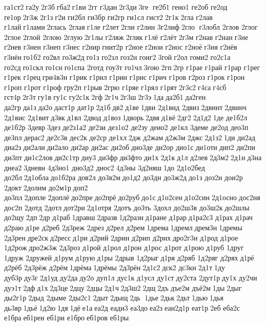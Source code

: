 га1ст2 га2у 2г3б гба2 г1ви 2гг 	г3дан 2г3ди 3ге  ге2б1 	гено1 	ге2об 	ге2од 	ге1ор 2г3ж 2г1з г2и 	ги2бл 	ги3бр 	ги2гр 	ги1сл 	гист2 2г1к 2гла  	г2лав 	г1лай г1лами 2глась 	2глая г1ле 	г2лет 2гли  	г2лин 
3г2лиф 2гло  г3лобл 	2глов 	2глог 	2глое 	2глой 	2глою 	2глую 2г1лы 	г2ляж 	2гляк г1лё 	г2лёт 2г3м 	г2нав 	г2нан г3не  	г2нев 	г3нен 	г3неп 	г3нес 	г2нир гнит2р 	г2ное 	г2нои 	г2нос 	г2ноё г3ня 	г2нёв 	г3нён го1б2 	го2вл 
го3ж2д го1з 	го2зл 	гоз2н 	гоиг2 3гой г2ол 	гоми2 
го2с1а 	го2сд го1скл 	го1сн го1спа 	2готд 	гоу3т 	го1чл 3гою 2гп 2гр  	г1рае 	г1рай 	г1рар 	г1рег 	г1рек 	г1рец гри4в3н 	г1рик 	г1рил 	г1рин 	г1рис 	г1рич 	г1ров 	г2роз 	г1рок 	г1рон 	г1роп 	г1рот 	г1роф 	гру2п 	г1рыв 2грю 	г1ряе 	г1рял 	г1рят 2г3с2 г4са г4сб 	гст4р 2г3т гу1в гу1с 
гу2с1к 2гф 2г1ч 2г3ш 2г3э 1да да2б1 да2ген 	да2гр да1з да2о даст1р 	дат1р 2д1б дв2 д1ве 1дви 
2д1вид 	2двиз 2двинт 2двинч 
2д1вис 
2д1вит д3вк д1вл 	2двод 	д1воз 1дворь 2двя д1вё 2дг2 2д1д2 1де 
де1б2л 
де1б2р 	3девр 3дез де2з1а2 	де2зи 
дез1о2 	де2зу 	деио2 	де1кл 	3деме 	де2од 	део3п 	де3пл дерас2 
де2с3в 	дес2к 	де2ср 	де1хл 2дж  	д2жам д2ж3м 2джс 2д1з2 1ди 	ди2ад 	диа2з ди2али ди2ало 	ди2ар 	ди2ас 	ди2об дио3де 	ди2ор 	дио1с ди1оти дип2 	ди2пи 	ди3пт ди1с2лов ди2с1тр диу3 	ди3фр ди3фто ди1х 2д1к д1л 	д2лев 2д3м2 2д1н д3на 	днеа2 3дневн 	4д3но1 
дно3д2 	днос2 4д3ны 
3д2няш 1до 
2д1о2бед 	до2бл 2д1обла до1б2ра 	дов2л 
до3в2м до1д2 	до3дн 
до3ж2д до1з 	доз2н 	дои2р 	2докт 2долим 
до2м1р доп2 	до3пл 2допле 2доплё до2пре до2прё до2руб до1с д1о2сен д1о2син 2д1осно дос2ня 	дос2п 	2дотд 	2дотл дот2ри 2д1отря 	2дотъ 	до3ть 	3дохл 
до2ш3в 
до3ш2к до2шлы 	до2щу 2дп 2др  	д1раб 1дравш 2дразв 1д2разн д1ране 	д1рар д1ра2с3 	д1рах 	д1рач 	д2раю д1ре 	д2реб 
2д3реж 	2дрез 	д2рел 	д2рем 1дрема 1дремл дрем3н 1дремы 
2д3рен дре2ск д2ресс д1ри 	д2рий 	2дрин 	д2рип 	д2рих дро2г3н 	д1род 	д1рое 
1д2рож дро2ж3ж 
2д3роз 	д1рой 	д1рол 	д1рон 	д1рос 	д1рот 	д1рою 	д1руб 	1друг 	1друж 
2дружей 	д1рум 	д1рую д1ры 	2дрыв 
1д2рыг д1ря 	д2ряб 
1д2ряг 	д2рях д1рё 	д2рёб 
2д3рёж 	д2рём 1дрёма 1дрёмы 
2д3рён 2д1с2 дск2 	дс3кн 2д1т 1ду 	дуб3р ду3г 2д1уд 	ду2да ду2о 	дуп1л 	дус1к 	д1усл 	ду1ст ду2ста 
2дут1р ду1х 	ду2чи 	дуэ1т 2дф д1х 2д3це 2дцу 2дцы 2д1ч 2д3ш2 2дщ 2дъ 	дъе2м 	дъё2м 1ды 2дыг 
ды2г1р 2дыд 	2дыме 	2ды2с1 2дыт 2дыщ 2дь  1дье 2дьк 2дьт 1дью 1дья 	дь3яр 1дьё 1д2ю 1дя 1дё е1а еа2д 	еади3 	еа3до еа2з еан2д1р 	еат1р 2еб 	еба2с 	е1бра еб1рен 	еб1ри 	е1бро еб1ров 	еб1ры 
